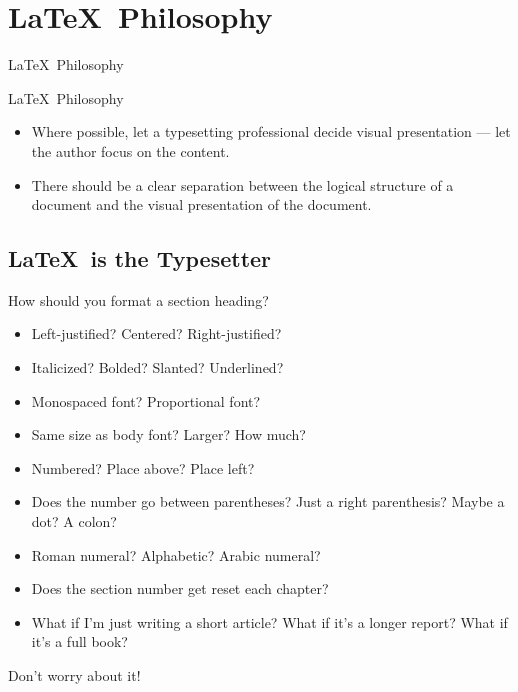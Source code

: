 \documentclass{beamer}                  %
\newcommand{\srule}{
	\rule{\textwidth}{1pt}\\
}
\newlength{\subsecwidth}
\newenvironment{slide}{
	\begin{frame} %
	\settowidth{\subsecwidth}{\insertsubsection} %
	\ifthenelse{\dimtest{\subsecwidth}{<}{1pt}}{ %
		\frametitle{\insertsection\\             %
		\vspace{-1ex}                            %
		\color{fore}\srule                       %
		\par                                     %
		\vspace{-3ex}                            %
		}
	}{                                           %
		\frametitle{\insertsection\ -- \insertsubsection\\ %
		\vspace{-1ex}                            %
		\color{fore}\srule                       %
		\par                                     %
		\vspace{-3ex}                            %
		}
	}
	\Large                                       %
}{
	\end{frame}
}
\newcommand{\titleslide}[1]{
	\section{#1}             %
	\begin{slide}
		\begin{center}
			\color{comments}
			\Huge            %
			#1               %
		\end{center}
	\end{slide}
}
\begin{document}
\titleslide{\LaTeX\ Philosophy}

\begin{slide}
	\LaTeX\ Philosophy
	\begin{itemize}
		\item Where possible, let a typesetting professional decide visual
		presentation --- let the author focus on the content.
		\item There should be a clear separation between the logical structure
		of a document and the visual presentation of the document.
	\end{itemize}
\end{slide}

\subsection{\LaTeX\ is the Typesetter}
\begin{slide}
	How should you format a section heading?
	\begin{itemize}
		\item<2> Left-justified?  Centered?  Right-justified?
		\item<2> Italicized?  Bolded?  Slanted?  Underlined?
		\item<2> Monospaced font?  Proportional font?
		\item<2> Same size as body font?  Larger?  How much?
		\item<2> Numbered?  Place above? Place left?
		\item<2> Does the number go between parentheses?  Just a right
		parenthesis?  Maybe a dot?  A colon?
		\item<2> Roman numeral?  Alphabetic?  Arabic numeral?
		\item<2> Does the section number get reset each chapter?
		\item<2> What if I'm just writing a short article?  What if it's a longer
		report?  What if it's a full book?
	\end{itemize}
\end{slide}

\begin{slide}
	\begin{center}
		Don't worry about it!
	\end{center}
\end{slide}
\end{document}
